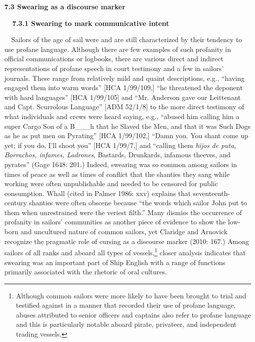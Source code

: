 \begin{styleStandard}
\textbf{7.3 Swearing as a discourse marker }
\end{styleStandard}


\begin{styleStandard}
\textbf{\ \ 7.3.1 Swearing to mark communicative intent}
\end{styleStandard}


\begin{styleStandard}
\ \ Sailors of the age of sail were and are still characterized by their tendency to use profane language. Although there are few examples of such profanity in official communications or logbooks, there are various direct and indirect representations of profane speech in court testimony and a few in sailors’ journals. These range from relatively mild and quaint descriptions, e.g., “having engaged them into warm words” [HCA 1/99/109,] “he threatened the deponent with hard languages” [HCA 1/99/105] and “Mr. Anderson gave our Leittenant and Capt. Scurrolous Language” [ADM 52/1/8] to the more direct testimony of what individuals and crews were heard saying, e.g., “abused him calling him a super Cargo Son of a B\_\_\_h that he Slaved the Men, and that it was Such Dogs as he as put men on Pyrating” [HCA 1/99/102,] “Damn you. You shant come up yet; if you do, I’ll shoot you” [HCA 1/99/7,] and “calling them \textit{hijos de puta, Borrachos, infames, Ladrones}, Bastards, Drunkards, infamous theeves, and pyrates” (Gage 1648: 201.) Indeed, swearing was so common among sailors in times of peace as well as times of conflict that the shanties they sang while working were often unpublishable and needed to be censored for public consumption. Whall (cited in Palmer 1986: xxv) explains that seventeenth-century shanties were often obscene because “the words which sailor John put to them when unrestrained were the veriest filth.” Many dismiss the occurrence of profanity in sailors’ communities as another piece of evidence to show the low-born and uncultured nature of common sailors, yet Claridge and Arnovick recognize the pragmatic role of cursing as a discourse marker (2010: 167.) Among sailors of all ranks and aboard all types of vessels,\footnote{ Although common sailors were more likely to have been brought to trial and testified against in a manner that recorded their use of profane language, abuses attributed to senior officers and captains also refer to profane language and this is particularly notable aboard pirate, privateer, and independent trading vessels.} closer analysis indicates that swearing was an important part of Ship English with a range of functions primarily associated with the rhetoric of oral cultures.
\end{styleStandard}


